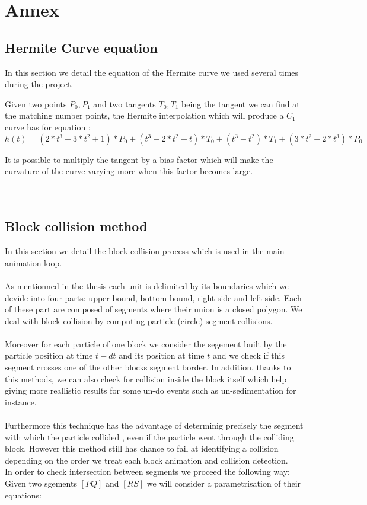 \documentclass[12pt, a4paper]{report} %
\begin{document}
\chapter{Annex}

\section{Hermite Curve equation}
In this section we detail the equation of the Hermite curve we used several times during the project.

Given two points $P_0, P_1$ and two tangents $T_0, T_1$ being the tangent we can find at the matching number points, the Hermite interpolation which will produce a $C_1$ curve has for equation : 
\begin{equation}
h(t) = (2*t^3 - 3*t^2 + 1)*P_0 + (t^3 - 2*t^2 + t)*T_0 + (t^3 -t^2)*T_1 +(3*t^2 - 2*t^3)*P_0
\end{equation}

It is possible to multiply the tangent by a bias factor which will make the curvature of the curve varying more when this factor becomes large.\\\\\

\section{Block collision method}
In this section we detail the block collision process which is used in the main animation loop.
\\\\
As mentionned in the thesis each unit is delimited by its boundaries which we devide into four parts: upper bound, bottom bound, right side and left side. Each of these part are composed of segments where their union is a closed polygon. We deal with block collision by computing particle (circle) segment collisions.\\\\ Moreover for each particle of one block we consider the segement built by the particle position at time $t - dt$ and its position at time $t$ and we check if this segment crosses one of the other blocks segment border. In addition, thanks to this methods, we can also check for collision inside the block itself which help giving more reallistic results for some un-do events such as  un-sedimentation for instance. \\\\
Furthermore this technique has the advantage of determinig precisely the segment with which the particle collided , even if the particle went through the colliding block. However this method still has chance to fail at identifying a collision depending on the order we treat each block animation and collision detection.\\
In order to check intersection between segments we proceed the following way:\\
Given two sgements $[PQ]$ and $[RS]$ we will consider a parametrisation of their equations: 
\end{document}
